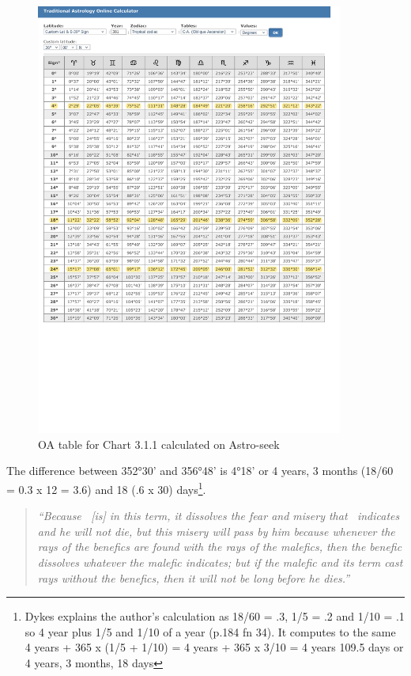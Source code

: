 \begin{figure}[H]
\centering
\includegraphics[width=0.9\textwidth]
	{diagrams/3.1.1-OA-Table }
\vspace{-8em}
\caption{OA table for Chart 3.1.1 calculated on Astro-seek}
\end{figure}

The difference between 352°30' and 356°48' is 4°18' or 4 years, 3 months (18/60 = 0.3 x 12 = 3.6) and 18 (.6 x 30) days\footnote{Dykes explains the author's calculation as 18/60 = .3, 1/5 = .2 and 1/10 = .1 so 4 year plus 1/5 and 1/10 of a year (p.184 fn 34). It computes to the same 4 years + 365 x (1/5 + 1/10) = 4 years + 365 x 3/10 = 4 years 109.5 days or 4 years, 3 months, 18 days}.

\begin{quote}
\textsl{``Because  \Venus\, [is] in this term, it dissolves the fear and misery that \Mars\, indicates and he will not die, but this misery will pass by him because whenever the rays of the benefics are found with the rays of the malefics, then the benefic dissolves whatever the malefic indicates; but if the malefic and its term cast rays without the benefics, then it will not be long before he dies.''}
\end{quote}

